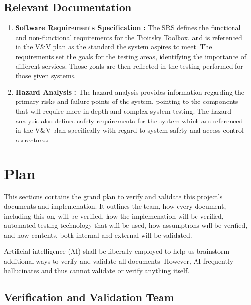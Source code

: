 \documentclass[12pt, titlepage]{article}
\begin{document}
\subsection{Relevant Documentation}

\begin{enumerate}
  \item \textbf{Software Requirements Specification \citep{TroitskySRS}:} The SRS defines the functional and non-functional requirements for the Troitsky Toolbox, and is referenced in the V\&V plan as 
  the standard the system aspires to meet. The requirements set the goals for the testing areas, identifying the importance of different services.
  Those goals are then reflected in the testing performed for those given systems.

  \item \textbf{Hazard Analysis \citep{TroitskyHazardAnalysis}:} The hazard analysis provides information regarding the primary risks and failure points of the system, pointing to the components that will require 
  more in-depth and complex system testing. The hazard analysis also defines safety requirements for the system which are referenced in the V\&V plan specifically with regard to system safety and 
  access control correctness. 

\end{enumerate}

\section{Plan}



  This sections contains the grand plan to verify and validate this project's documents and implemenation. It outlines 
  the team, how every document, including this on, will be verified, how the implemenation will be verified,
  automated testing technology that will be used, how assumptions will be verified, and how contents, both
  internal and external will be validated.

  Artificial intelligence (AI) shall be liberally employed to help us brainstorm additional ways to 
  verify and validate all documents. However, AI frequently hallucinates and thus cannot validate or 
  verify anything itself.



\subsection{Verification and Validation Team}
\end{document}
